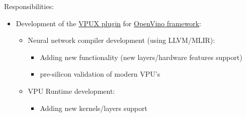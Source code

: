 \documentclass[a4paper,11pt]{memoir}
\newif\ifdetailed
\begin{document}
{
\ifdetailed
Contact info:
\begin{itemize}
	\item Address: Russia, Nizhnii Novgorod, Turgeneva 30
	\item Phone/e-mail: +7 495 641 45 00 / bhr.russia@intel.com
\end{itemize}
\fi
Responsibilities:
\begin{itemize}
	\item Development of the \href{https://github.com/openvinotoolkit/vpux-plugin}{VPUX plugin} for \href{https://github.com/openvinotoolkit/openvino}{OpenVino framework}:
	\begin{itemize}
		\item Neural network compiler development (using LLVM/MLIR):
		\begin{itemize}
			\item Adding new functionality (new layers/hardware features support)
			\item pre-silicon validation of modern VPU's
		\end{itemize}
		\item VPU Runtime development:
		\begin{itemize}
			\item Adding new kernels/layers support
		\end{itemize}
	\end{itemize}	
\end{itemize}
\ifdetailed
Detailed achievements:
\begin{itemize}
	\item Learned:
	\begin{itemize} 
		\item Vision Processing Unit perfomance
		\item neural networks perfomance on deep level
		\item neural networks compilers perfomance
		\item VPU runtime
	\end{itemize}
	\item Participated in the creation/development of the framework for pre-silicon validation
	\item Ensured all hardware features of VPU are tested on pre-silicon stage
\end{itemize}
\fi
}
\end{document}
